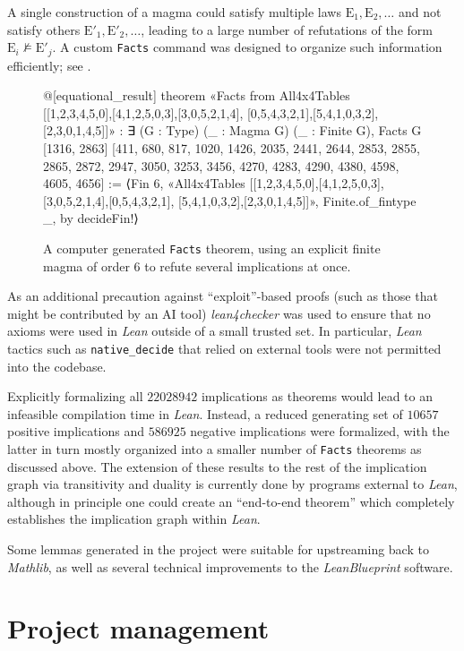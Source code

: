 \documentclass[12pt]{amsart}
\theoremstyle{definition}
\newcommand{\nmodels}{\not\models}
\newcommand{\E}{\mathrm{E}}
\begin{document}
A single construction of a magma could satisfy multiple laws $\E_1,\E_2,\dots$ and not satisfy others $\E'_1, \E'_2, \dots$, leading to a large number of refutations of the form $\E_i \nmodels \E'_j$.  A custom \texttt{Facts} command was designed to organize such information efficiently; see .

\begin{figure}
\centering
\begin{lean}
@[equational_result]
theorem «Facts from All4x4Tables [[1,2,3,4,5,0],[4,1,2,5,0,3],[3,0,5,2,1,4],
[0,5,4,3,2,1],[5,4,1,0,3,2],[2,3,0,1,4,5]]» :
  ∃ (G : Type) (_ : Magma G) (_ : Finite G), Facts G [1316, 2863] [411, 680,
  817, 1020, 1426, 2035, 2441, 2644, 2853, 2855, 2865, 2872, 2947, 3050,
  3253, 3456, 4270, 4283, 4290, 4380, 4598, 4605, 4656] :=
⟨Fin 6, «All4x4Tables [[1,2,3,4,5,0],[4,1,2,5,0,3],[3,0,5,2,1,4],[0,5,4,3,2,1],
[5,4,1,0,3,2],[2,3,0,1,4,5]]», Finite.of_fintype _, by decideFin!⟩
\end{lean}
\caption{A computer generated \texttt{Facts} theorem, using an explicit finite magma of order $6$ to refute several implications at once.}
\label{fig:facts}
\end{figure}

As an additional precaution against ``exploit''-based proofs (such as those that might be contributed by an AI tool) \emph{lean4checker} was used to ensure that no axioms were used in \emph{Lean} outside of a small trusted set.  In particular, \emph{Lean} tactics such as \texttt{native\_decide} that relied on external tools were not permitted into the codebase.

Explicitly formalizing all $\num{22028942}$ implications as theorems would lead to an infeasible compilation time in  \emph{Lean}.  Instead, a reduced generating set of $\num{10657}$ positive implications and $\num{586925}$ negative implications were formalized, with the latter in turn mostly organized into a smaller number of \texttt{Facts} theorems as discussed above.  The extension of these results to the rest of the implication graph via transitivity and duality is currently done by programs external to \emph{Lean}, although in principle one could create an ``end-to-end theorem'' which completely establishes the implication graph within \emph{Lean}.

Some lemmas generated in the project were suitable for upstreaming back to \emph{Mathlib}, as well as several technical improvements to the \emph{LeanBlueprint} software.

\section{Project management}\label{project-sec}
\end{document}
